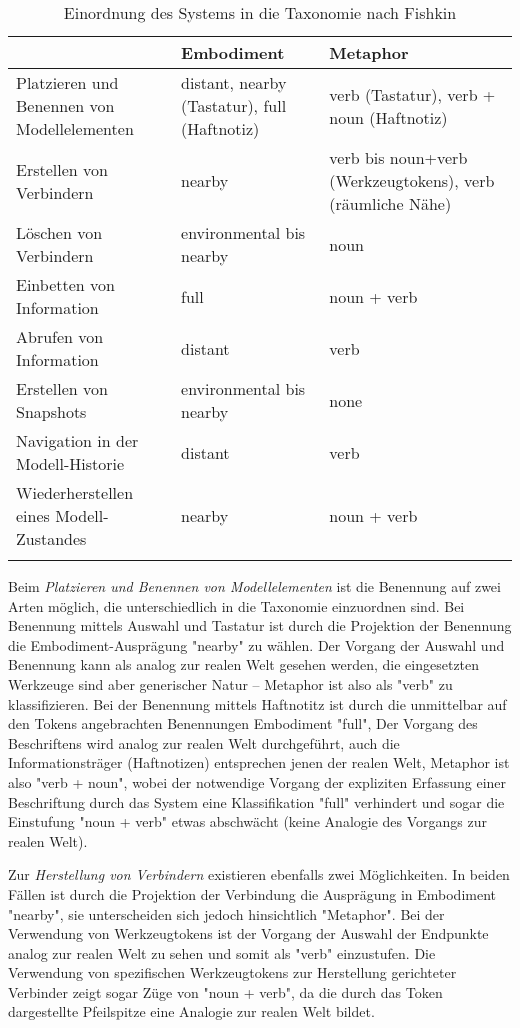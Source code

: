 	\begin{longtable}{| p{6cm} || p{3cm} | p{3cm} |} \hline
		 & Embodiment & Metaphor \\ \hline \hline
		Platzieren und Benennen von Modellelementen & distant, nearby (Tastatur), full (Haftnotiz) & verb (Tastatur), verb + noun (Haftnotiz) \\ \hline
		Erstellen von Verbindern & nearby & verb bis noun+verb (Werkzeugtokens), verb (räumliche Nähe)\\ \hline
		Löschen von Verbindern & environmental bis nearby & noun \\ \hline
		Einbetten von Information & full & noun + verb \\ \hline
		Abrufen von Information & distant & verb \\ \hline
		Erstellen von Snapshots & environmental bis nearby & none \\ \hline
		Navigation in der Modell-Historie & distant & verb \\ \hline
		Wiederherstellen eines Modell-Zustandes & nearby & noun + verb\\ \hline
			\caption{Einordnung des Systems in die Taxonomie nach Fishkin}
			\label{tab:einordnungFishkin}
		
	\end{longtable}

Beim \emph{Platzieren und Benennen von Modellelementen} ist die Benennung auf zwei Arten möglich, die unterschiedlich in die Taxonomie einzuordnen sind. Bei Benennung mittels Auswahl und Tastatur ist durch die Projektion der Benennung die Embodiment-Ausprägung "nearby" zu wählen. Der Vorgang der Auswahl und Benennung kann als analog zur realen Welt gesehen werden, die eingesetzten Werkzeuge sind aber generischer Natur -- Metaphor ist also als "verb" zu klassifizieren. Bei der Benennung mittels Haftnotitz ist durch die unmittelbar auf den Tokens angebrachten Benennungen Embodiment "full", Der Vorgang des Beschriftens wird analog zur realen Welt durchgeführt, auch die Informationsträger (Haftnotizen) entsprechen jenen der realen Welt, Metaphor ist also "verb + noun", wobei  der notwendige Vorgang der expliziten Erfassung einer Beschriftung durch das System eine Klassifikation "full" verhindert und sogar die Einstufung "noun + verb" etwas abschwächt (keine Analogie des Vorgangs zur realen Welt).

Zur \emph{Herstellung von Verbindern} existieren ebenfalls zwei Möglichkeiten. In beiden Fällen ist durch die Projektion der Verbindung die Ausprägung in Embodiment "nearby", sie unterscheiden sich jedoch hinsichtlich "Metaphor". Bei der Verwendung von Werkzeugtokens ist der Vorgang der Auswahl der Endpunkte analog zur realen Welt zu sehen und somit als "verb" einzustufen. Die Verwendung von spezifischen Werkzeugtokens zur Herstellung gerichteter Verbinder zeigt sogar Züge von "noun + verb", da die durch das Token dargestellte Pfeilspitze eine Analogie zur realen Welt bildet.

